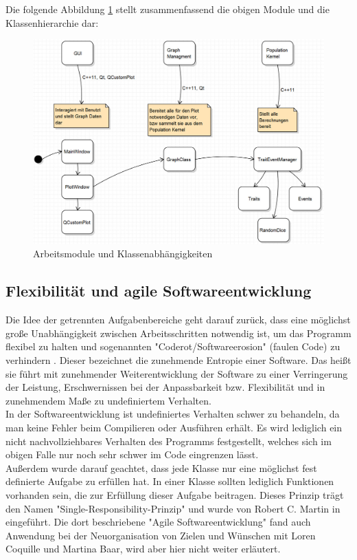 \documentclass[11pt, a4paper, german]{article}
\theoremstyle{plain}
\begin{document}
 	Die folgende Abbildung \ref{Module und Klassen} stellt zusammenfassend die obigen Module und die Klassenhierarchie dar:
	\begin{figure}[H]
		\centering
		\includegraphics[width=1 \linewidth]{./Pictures/Bild_Module}
		\caption[Module]{Arbeitsmodule und Klassenabhängigkeiten}
		\label{Module und Klassen}
	\end{figure}	
		
	\subsection{Flexibilität und agile Softwareentwicklung}
	Die Idee der getrennten Aufgabenbereiche geht darauf zurück, dass eine möglichst große Unabhängigkeit zwischen Arbeitsschritten notwendig ist, um das Programm flexibel zu halten und sogenannten "{}Coderot/Software\-erosion"{} (faulen Code) zu verhindern \cite{martin2008clean}. Dieser bezeichnet die zunehmende Entropie einer Software. Das heißt sie führt mit zunehmender Weiterentwicklung der Software zu einer Verringerung der Leistung, Erschwernissen bei der Anpassbarkeit bzw. Flexibilität und in zunehmendem Maße zu undefiniertem Verhalten.\\
	In der Softwareentwicklung ist undefiniertes Verhalten schwer zu behandeln, da man keine Fehler beim Compilieren oder Ausführen erhält. Es wird lediglich ein nicht nachvollziehbares Verhalten des Programms festgestellt, welches sich im obigen Falle nur noch sehr schwer im Code eingrenzen lässt.\\
	
	Außerdem wurde darauf geachtet, dass jede Klasse nur eine möglichst fest definierte Aufgabe zu erfüllen hat. In einer Klasse sollten lediglich Funktionen vorhanden sein, die zur Erfüllung dieser Aufgabe beitragen. Dieses Prinzip trägt den Namen "{}Single-Responsibility-Prinzip"{} und wurde von Robert C. Martin in \cite{Martin:2003:ASD:515230} eingeführt. Die dort beschriebene "{}Agile Softwareentwicklung"{} fand auch Anwendung bei der Neuorganisation von Zielen und Wünschen mit Loren Coquille und Martina Baar, wird aber hier nicht weiter erläutert.
	
\end{document}
